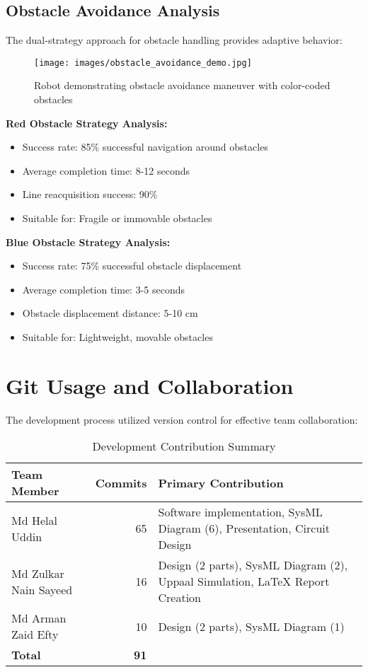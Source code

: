 \documentclass[12pt,a4paper]{article}
\begin{document}
\subsection{Obstacle Avoidance Analysis}

The dual-strategy approach for obstacle handling provides adaptive behavior:

\begin{figure}[H]
    \centering
    \texttt{[image: images/obstacle\_avoidance\_demo.jpg]}
    \caption{Robot demonstrating obstacle avoidance maneuver with color-coded obstacles}
    \label{fig:obstacle_avoidance_demo}
\end{figure}

\textbf{Red Obstacle Strategy Analysis:}
\begin{itemize}
    \item Success rate: 85\% successful navigation around obstacles
    \item Average completion time: 8-12 seconds
    \item Line reacquisition success: 90\%
    \item Suitable for: Fragile or immovable obstacles
\end{itemize}

\textbf{Blue Obstacle Strategy Analysis:}
\begin{itemize}
    \item Success rate: 75\% successful obstacle displacement
    \item Average completion time: 3-5 seconds
    \item Obstacle displacement distance: 5-10 cm
    \item Suitable for: Lightweight, movable obstacles
\end{itemize}

\section{Git Usage and Collaboration}

The development process utilized version control for effective team collaboration:

\begin{table}[H]
\centering
\small
\begin{tabular}{@{}p{3.5cm}rp{6cm}@{}}
\toprule
\textbf{Team Member} & \textbf{Commits} & \textbf{Primary Contribution}\\
\midrule
Md Helal Uddin & 65 & Software implementation, SysML Diagram (6), Presentation, Circuit Design \\
Md Zulkar Nain Sayeed & 16 & Design (2 parts), SysML Diagram (2), Uppaal Simulation, LaTeX Report Creation \\
Md Arman Zaid Efty & 10 & Design (2 parts), SysML Diagram (1)\\
\midrule
\textbf{Total} & \textbf{91} & \\
\bottomrule
\end{tabular}
\caption{Development Contribution Summary}
\label{tab:git_stats}
\end{table}
\end{document}
